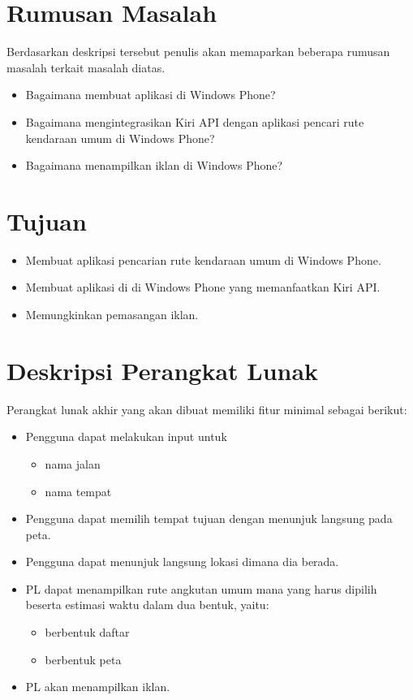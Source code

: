 \documentclass[a4paper,twoside]{article}
\begin{document}
\section{Rumusan Masalah}
Berdasarkan deskripsi tersebut penulis akan memaparkan beberapa rumusan masalah terkait masalah diatas.
\begin{itemize}
	\item Bagaimana membuat aplikasi di Windows Phone?
	\item Bagaimana mengintegrasikan Kiri API dengan aplikasi pencari rute kendaraan umum di Windows Phone?
	\item Bagaimana menampilkan iklan di Windows Phone?
\end{itemize}

\section{Tujuan}
\begin{itemize}
	\item Membuat aplikasi pencarian rute kendaraan umum di Windows Phone.
	\item Membuat aplikasi di di Windows Phone yang memanfaatkan Kiri API.
	\item Memungkinkan pemasangan iklan.
\end{itemize}
\section{Deskripsi Perangkat Lunak}
Perangkat lunak akhir yang akan dibuat memiliki fitur minimal sebagai berikut:
\begin{itemize}
	\item Pengguna dapat melakukan input untuk
	\begin{itemize}
		\item nama jalan
		\item nama tempat
	\end{itemize}
	\item Pengguna dapat memilih tempat tujuan dengan menunjuk langsung pada peta.
	\item Pengguna dapat menunjuk langsung lokasi dimana dia berada.
	\item PL dapat menampilkan rute angkutan umum mana yang harus dipilih beserta estimasi waktu dalam dua bentuk, yaitu:
	\begin{itemize}
		\item berbentuk daftar
		\item berbentuk peta
	\end{itemize}
	\item PL akan menampilkan iklan.
\end{itemize}
\end{document}
